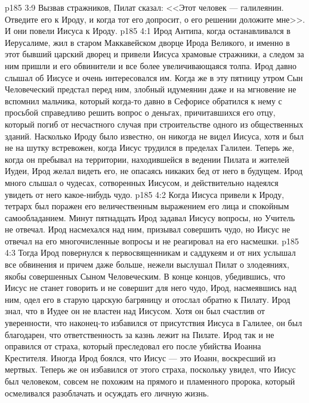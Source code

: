 \vs p185 3:9 Вызвав стражников, Пилат сказал: <<Этот человек --- галилеянин. Отведите его к Ироду, и когда тот его допросит, о его решении доложите мне>>. И они повели Иисуса к Ироду.
\vs p185 4:1 Ирод Антипа, когда останавливался в Иерусалиме, жил в старом Маккавейском дворце Ирода Великого, и именно в этот бывший царский дворец и привели Иисуса храмовые стражники, а следом за ним пришли и его обвинители и все более увеличивающаяся толпа. Ирод давно слышал об Иисусе и очень интересовался им. Когда же в эту пятницу утром Сын Человеческий предстал перед ним, злобный идумеянин даже и на мгновение не вспомнил мальчика, который когда\hyp{}то давно в Сефорисе обратился к нему с просьбой справедливо решить вопрос о деньгах, причитавшихся его отцу, который погиб от несчастного случая при строительстве одного из общественных зданий. Насколько Ироду было известно, он никогда не видел Иисуса, хотя и был не на шутку встревожен, когда Иисус трудился в пределах Галилеи. Теперь же, когда он пребывал на территории, находившейся в ведении Пилата и жителей Иудеи, Ирод желал видеть его, не опасаясь никаких бед от него в будущем. Ирод много слышал о чудесах, сотворенных Иисусом, и действительно надеялся увидеть от него какое\hyp{}нибудь чудо.
\vs p185 4:2 Когда Иисуса привели к Ироду, тетрарх был поражен его величественным выражением его лица и спокойным самообладанием. Минут пятнадцать Ирод задавал Иисусу вопросы, но Учитель не отвечал. Ирод насмехался над ним, призывал совершить чудо, но Иисус не отвечал на его многочисленные вопросы и не реагировал на его насмешки.
\vs p185 4:3 Тогда Ирод повернулся к первосвященникам и саддукеям и от них услышал все обвинения и причем даже больше, нежели выслушал Пилат о злодеяниях, якобы совершенных Сыном Человеческим. В конце концов, убедившись, что Иисус не станет говорить и не совершит для него чудо, Ирод, насмеявшись над ним, одел его в старую царскую багряницу и отослал обратно к Пилату. Ирод знал, что в Иудее он не властен над Иисусом. Хотя он был счастлив от уверенности, что наконец\hyp{}то избавился от присутствия Иисуса в Галилее, он был благодарен, что ответственность за казнь лежит на Пилате. Ирод так и не оправился от страха, который преследовал его после убийства Иоанна Крестителя. Иногда Ирод боялся, что Иисус --- это Иоанн, воскресший из мертвых. Теперь же он избавился от этого страха, поскольку увидел, что Иисус был человеком, совсем не похожим на прямого и пламенного пророка, который осмеливался разоблачать и осуждать его личную жизнь.
